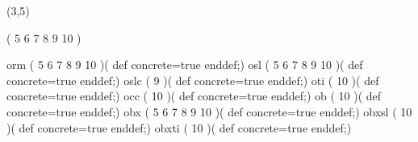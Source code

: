 %
%
%
%
%
%
%

\lhvercheck(3,5)

%
\MakeFileHeadstrue %
     \tablevalues                    ( 5 6 7 8 9 10              )

     \makefont \fonttwoletters orm   ( 5 6 7 8 9 10              )(%
                                                def concrete=true enddef;)
     \makefont \fonttwoletters osl   ( 5 6 7 8 9 10              )(%
                                                def concrete=true enddef;)
     \makefont \fonttwoletters oslc  (         9                 )(%
                                                def concrete=true enddef;)
     \makefont \fonttwoletters oti   (           10              )(%
                                                def concrete=true enddef;)
     \makefont \fonttwoletters occ   (           10              )(%
                                                def concrete=true enddef;)
%
     \makefont \fonttwoletters ob    (           10              )(%
                                                def concrete=true enddef;)
     \makefont \fonttwoletters obx   ( 5 6 7 8 9 10              )(%
                                                def concrete=true enddef;)
     \makefont \fonttwoletters obxsl (           10              )(%
                                                def concrete=true enddef;)
     \makefont \fonttwoletters obxti (           10              )(%
                                                def concrete=true enddef;)
\endinput
